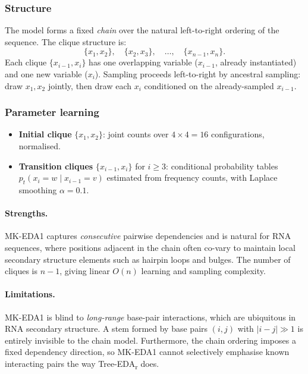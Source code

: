 \documentclass[11pt,a4paper]{article}
\begin{document}
\subsubsection*{Structure}

The model forms a fixed \emph{chain} over the natural left-to-right ordering
of the sequence. The clique structure is:
\[
  \{x_1, x_2\},\quad \{x_2, x_3\},\quad \ldots,\quad \{x_{n-1}, x_n\}.
\]
Each clique $\{x_{i-1}, x_i\}$ has one overlapping variable ($x_{i-1}$,
already instantiated) and one new variable ($x_i$). Sampling proceeds
left-to-right by ancestral sampling: draw $x_1, x_2$ jointly, then draw
each $x_i$ conditioned on the already-sampled $x_{i-1}$.

\subsubsection*{Parameter learning}

\begin{itemize}
  \item \textbf{Initial clique} $\{x_1, x_2\}$: joint counts over
    $4 \times 4 = 16$ configurations, normalised.
  \item \textbf{Transition cliques} $\{x_{i-1}, x_i\}$ for $i \geq 3$:
    conditional probability tables $p_t(x_i = w \mid x_{i-1} = v)$ estimated
    from frequency counts, with Laplace smoothing $\alpha = 0.1$.
\end{itemize}

\paragraph{Strengths.} MK-EDA1 captures \emph{consecutive} pairwise
dependencies and is natural for RNA sequences, where positions adjacent in
the chain often co-vary to maintain local secondary structure elements such
as hairpin loops and bulges. The number of cliques is $n-1$, giving linear
$O(n)$ learning and sampling complexity.

\paragraph{Limitations.} MK-EDA1 is blind to \emph{long-range} base-pair
interactions, which are ubiquitous in RNA secondary structure. A stem formed
by base pairs $(i, j)$ with $|i - j| \gg 1$ is entirely invisible to the
chain model. Furthermore, the chain ordering imposes a fixed dependency
direction, so MK-EDA1 cannot selectively emphasise known interacting pairs
the way Tree-EDA\textsubscript{r} does.
\end{document}
